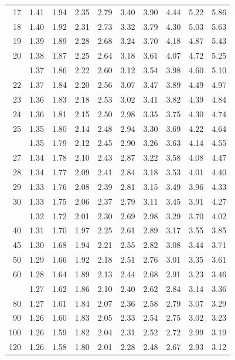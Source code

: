 \documentclass[10pt]{article}
\begin{document}
\begin{longtable}{@{}r!{\vrule width 0.8pt\hspace{0.55em}}rrrrrrrrr@{}}
17 & 1.41 & 1.94 & 2.35 & 2.79 & 3.40 & 3.90 & 4.44 & 5.22 & 5.86 \\
18 & 1.40 & 1.92 & 2.31 & 2.73 & 3.32 & 3.79 & 4.30 & 5.03 & 5.63 \\
19 & 1.39 & 1.89 & 2.28 & 2.68 & 3.24 & 3.70 & 4.18 & 4.87 & 5.43 \\
20 & 1.38 & 1.87 & 2.25 & 2.64 & 3.18 & 3.61 & 4.07 & 4.72 & 5.25 \\
 & 1.37 & 1.86 & 2.22 & 2.60 & 3.12 & 3.54 & 3.98 & 4.60 & 5.10 \\
22 & 1.37 & 1.84 & 2.20 & 2.56 & 3.07 & 3.47 & 3.89 & 4.49 & 4.97 \\
23 & 1.36 & 1.83 & 2.18 & 2.53 & 3.02 & 3.41 & 3.82 & 4.39 & 4.84 \\
24 & 1.36 & 1.81 & 2.15 & 2.50 & 2.98 & 3.35 & 3.75 & 4.30 & 4.74 \\
25 & 1.35 & 1.80 & 2.14 & 2.48 & 2.94 & 3.30 & 3.69 & 4.22 & 4.64 \\
 & 1.35 & 1.79 & 2.12 & 2.45 & 2.90 & 3.26 & 3.63 & 4.14 & 4.55 \\
27 & 1.34 & 1.78 & 2.10 & 2.43 & 2.87 & 3.22 & 3.58 & 4.08 & 4.47 \\
28 & 1.34 & 1.77 & 2.09 & 2.41 & 2.84 & 3.18 & 3.53 & 4.01 & 4.40 \\
29 & 1.33 & 1.76 & 2.08 & 2.39 & 2.81 & 3.15 & 3.49 & 3.96 & 4.33 \\
30 & 1.33 & 1.75 & 2.06 & 2.37 & 2.79 & 3.11 & 3.45 & 3.91 & 4.27 \\
 & 1.32 & 1.72 & 2.01 & 2.30 & 2.69 & 2.98 & 3.29 & 3.70 & 4.02 \\
40 & 1.31 & 1.70 & 1.97 & 2.25 & 2.61 & 2.89 & 3.17 & 3.55 & 3.85 \\
45 & 1.30 & 1.68 & 1.94 & 2.21 & 2.55 & 2.82 & 3.08 & 3.44 & 3.71 \\
50 & 1.29 & 1.66 & 1.92 & 2.18 & 2.51 & 2.76 & 3.01 & 3.35 & 3.61 \\
60 & 1.28 & 1.64 & 1.89 & 2.13 & 2.44 & 2.68 & 2.91 & 3.23 & 3.46 \\
 & 1.27 & 1.62 & 1.86 & 2.10 & 2.40 & 2.62 & 2.84 & 3.14 & 3.36 \\
80 & 1.27 & 1.61 & 1.84 & 2.07 & 2.36 & 2.58 & 2.79 & 3.07 & 3.29 \\
90 & 1.26 & 1.60 & 1.83 & 2.05 & 2.33 & 2.54 & 2.75 & 3.02 & 3.23 \\
100 & 1.26 & 1.59 & 1.82 & 2.04 & 2.31 & 2.52 & 2.72 & 2.99 & 3.19 \\
120 & 1.26 & 1.58 & 1.80 & 2.01 & 2.28 & 2.48 & 2.67 & 2.93 & 3.12 \\

\end{longtable}
\end{document}
